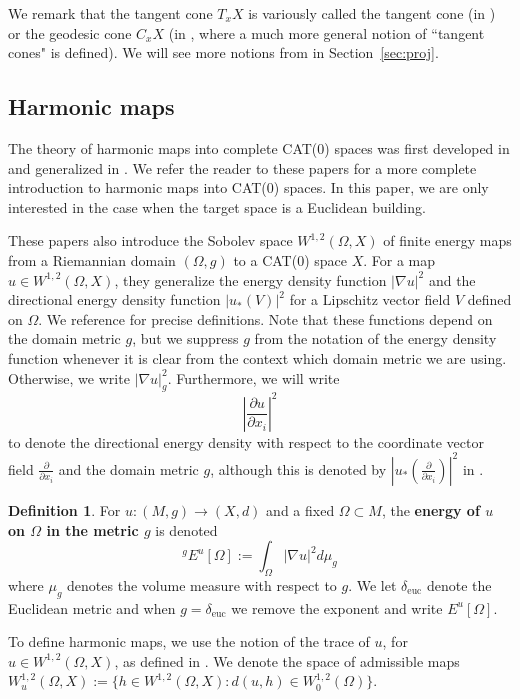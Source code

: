 \documentclass[12pt]{amsart}
\theoremstyle{definition}
\newtheorem{definition}[theorem]{Definition}
\numberwithin{equation}{section}
\newcommand{\deltae}{\delta_{\text{euc}}}
\begin{document}
We remark that the tangent cone $T_xX$ is variously called the tangent cone (in \cite{kleiner-leeb}) or the geodesic cone $C_xX$ (in \cite{lytchak}, where a much more general notion of ``tangent cones" is defined).  We will see more notions from \cite{lytchak} in Section~\ref{sec:proj}.

\subsection{Harmonic maps}
The theory of harmonic maps into complete CAT(0) spaces was first developed in \cite{gromov-schoen} and generalized in \cite{korevaar-schoen1,korevaar-schoen2,jost}.  We refer the reader to these papers for a more complete introduction to harmonic maps into CAT(0) spaces.    In this paper, we are only interested in the case when the target space is a Euclidean building.

These papers also introduce the Sobolev space $W^{1,2}(\Omega,X)$ of finite energy maps from a Riemannian domain $(\Omega,g)$ to a CAT(0) space $X$.  For a map $u \in W^{1,2}(\Omega,X)$, they generalize  the energy density function $|\nabla u|^2$ and the directional energy density function $|u_*(V)|^2$ for a  Lipschitz vector field $V$ defined on $\Omega$. We reference \cite[Section 1]{korevaar-schoen1} for precise definitions.    Note that these functions depend on the  domain metric $g$, but we suppress $g$ from the notation of the energy density function whenever it is clear from the context which domain metric we are using.  Otherwise, we write $|\nabla u|_g^2$. Furthermore, we will write 
$$\left|\frac{\partial u}{\partial x_i}\right|^2
$$ to denote the directional energy density with respect to the coordinate vector field $\frac{\partial}{\partial x_i}$ and the domain metric $g$, although this is  denoted by $\left|u_*(\frac{\partial}{\partial x_i})\right|^2$ in \cite{korevaar-schoen1}.

\begin{definition}
For $u:(M,g) \to (X,d)$ and a fixed $\Omega \subset M$, the {\bf energy of $u$ on $\Omega$ in the metric $g$} is denoted
\[
{^g}E^u[\Omega]:=\int_\Omega|\nabla u|^2d\mu_g
\]where $\mu_g$ denotes the volume measure with respect to $g$. We let $\deltae$ denote the Euclidean metric and when $g = \deltae$ we remove the exponent and write $E^u[\Omega]$.
\end{definition}


To define harmonic maps, we use the notion of the trace of $u$, for $u\in W^{1,2}(\Omega,X)$, as defined in \cite{korevaar-schoen1}. We denote the space of admissible maps $W^{1,2}_u(\Omega, X):= \{ h \in W^{1,2}(\Omega, X) : d(u,h) \in W^{1,2}_0(\Omega)\}$. 
\end{document}
